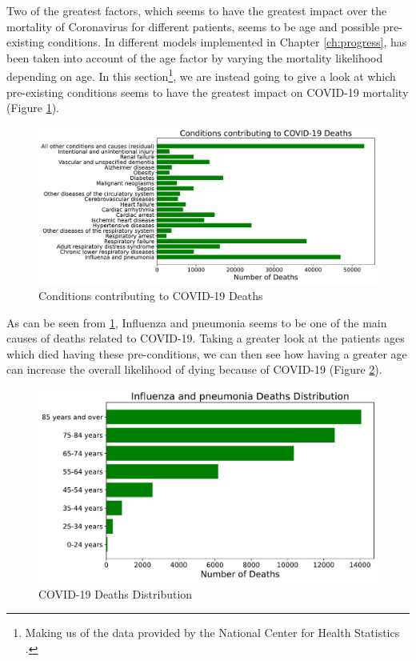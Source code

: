 Two of the greatest factors, which seems to have the greatest impact over the mortality of Coronavirus for different patients, seems to be age and possible pre-existing conditions. In different models implemented in Chapter \ref{ch:progress}, has been taken into account of the age factor by varying the mortality likelihood depending on age. In this section\footnote{Making us of the data provided by the National Center for Health Statistics \cite{deaths_data}.}, we are instead going to give a look at which pre-existing conditions seems to have the greatest impact on COVID-19 mortality (Figure \ref{d_cond}). 

\begin{figure}[ht!]%
    \centering
    \includegraphics[width=0.85\linewidth]{latex/images/deaths_conditions.pdf}
    \vspace{-0.2cm}
    \caption{Conditions contributing to COVID-19 Deaths}
    \label{d_cond}
\end{figure}

As can be seen from \ref{d_cond}, Influenza and pneumonia seems to be one of the main causes of deaths related to COVID-19. Taking a greater look at the patients ages which died having these pre-conditions, we can then see how having a greater age can increase the overall likelihood of dying because of COVID-19 (Figure \ref{d_top}).

\begin{figure}[ht!]%
    \centering
    \includegraphics[width=0.65\linewidth]{latex/images/deaths_top.pdf}
    \vspace{-0.2cm}
    \caption{COVID-19 Deaths Distribution}
    \label{d_top}
\end{figure}

